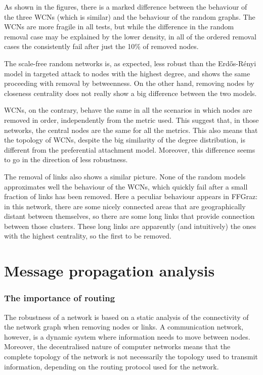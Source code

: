 \documentclass[oneside,openany]{memoir}
\begin{document}
As shown in the figures, there is a marked difference between the
behaviour of the three WCNs (which is similar) and the behaviour of the
random graphs. The WCNs are more fragile in all tests, but while the
difference in the random removal case may be explained by the lower
density, in all of the ordered removal cases the consistently fail after
just the 10\% of removed nodes.

The scale-free random networks is, as expected, less robust than the
Erd\H{o}s-Rényi model in targeted attack to nodes with the highest
degree, and shows the same proceeding with removal by betweenness. On
the other hand, removing nodes by closeness centrality does not really
show a big difference between the two models.

WCNs, on the contrary, behave the same in all the scenarios in which
nodes are removed in order, independently from the metric used. This
suggest that, in those networks, the central nodes are the same for all
the metrics. This also means that the topology of WCNs, despite the big
similarity of the degree distribution, is different from the
preferential attachment model. Moreover, this difference seems to go in
the direction of less robustness.

The removal of links also shows a similar picture. None of the random
models approximates well the behaviour of the WCNs, which quickly fail
after a small fraction of links has been removed. Here a peculiar
behaviour appears in FFGraz: in this network, there are some nicely
connected areas that are geographically distant between themselves, so
there are some long links that provide connection between those
clusters. These long links are apparently (and intuitively) the ones
with the highest centrality, so the first to be removed.

\chapter{Message propagation
analysis}\label{message-propagation-analysis}

\subsection{The importance of routing}\label{the-importance-of-routing}

The robustness of a network is based on a static analysis of the
connectivity of the network graph when removing nodes or links. A
communication network, however, is a dynamic system where information
needs to move between nodes. Moreover, the decentralised nature of
computer networks means that the complete topology of the network is not
necessarily the topology used to transmit information, depending on the
routing protocol used for the network.
\end{document}
